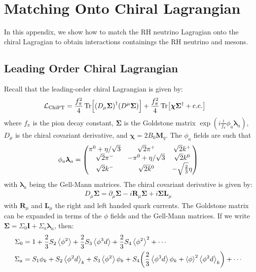 

\section{Matching Onto Chiral Lagrangian}

In this appendix, we show how to match the RH neutrino Lagragian onto the chiral
Lagragian to obtain interactions containings the RH neutrino and mesons.

\subsection{Leading Order Chiral Lagrangian}

Recall that the leading-order chiral Lagrangian is given by:
\begin{align}
    \mathcal{L}_{\mathrm{ChiPT}} & = \frac{f_{\pi}^{2}}{4}\Tr[
        \qty(D_{\mu}\bm{\Sigma})^{\dagger}
        \qty(D^{\mu}\bm{\Sigma})
    ]
    + \frac{f_{\pi}^{2}}{4}\Tr[\bm{\chi}\bm{\Sigma}^{\dagger} + \mathrm{c.c.}]
\end{align}
where \(f_{\pi}\) is the pion decay constant, \(\bm{\Sigma}\) is the Goldstone
matrix \(\exp(i\frac{i}{f_{\pi}}\phi_{a}\bm{\lambda}_{a})\),
\(D_{\mu}\) is the chiral covariant derivative, and
\(\bm{\chi} = 2B_{0}\bm{M}_{q}\). The \(\phi_{a}\) fields are such that
\begin{align}
    \phi_{a}\bm{\lambda}_{a} =
    \mqty(
    \pi^{0} + \eta/\sqrt{3} & \sqrt{2}\pi^{+}         & \sqrt{2}k^{+}           \\
    \sqrt{2}\pi^{-}         & -\pi^{0} +\eta/\sqrt{3} & \sqrt{2}k^{0}           \\
    \sqrt{2}k^{-}           & \sqrt{2}\bar{k}^{0}     & -\sqrt{\frac{2}{3}}\eta \\
    )
\end{align}
with \(\bm{\lambda}_{a}\) being the Gell-Mann matrices. The chiral covariant
derivative is given by:
\begin{align}
    D_{\mu}\bm{\Sigma} = \partial_{\mu}\bm{\Sigma} - i\bm{R}_{\mu}\bm{\Sigma} + i\bm{\Sigma}\bm{L}_{\mu}
\end{align}
with \(\bm{R}_{\mu}\) and \(\bm{L}_{\mu}\) the right and left handed quark currents.
The Goldstone matrix can be expanded in terms of the \(\phi\) fields and the Gell-Mann
matrices. If we write \(\bm{\Sigma} = \Sigma_{0}\bm{I} + \Sigma_{a}\bm{\lambda}_{a}\),
then:
\begin{align}
    \Sigma_{0}
     & =
    1
    + \frac{2}{3}S_{2}\expval{\phi^2}
    + \frac{2}{3}S_{3}\expval{\phi^3 d}
    + \frac{2}{3}S_{4}\expval{\phi^2}^{2}
    + \cdots \\
    \Sigma_{a}
     & =
    S_{1}\phi_{k}
    + S_{2}\expval{\phi^{2}d}_{k}
    + S_{3}\expval{\phi^{2}} \phi_{k}
    + S_{4}\qty(\frac{2}{3}\expval{\phi^{3}d}\phi_{k} + \expval{\phi}^{2}\expval{\phi^{2}d}_{k})
    + \cdots
\end{align}
